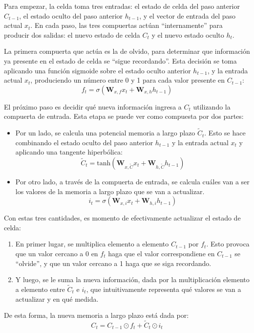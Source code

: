 \documentclass[../../main.tex]{subfiles}
\begin{document}
Para empezar, la celda toma tres entradas: el estado de celda del paso anterior
\(C_{t-1}\), el estado oculto del paso anterior \(h_{t-1}\), y el vector de entrada del
paso actual \(x_t\). En cada paso, las tres compuertas actúan ``internamente'' para
producir dos salidas: el nuevo estado de celda \(C_t\) y el nuevo estado oculto \(h_t\).

La primera compuerta que actúa es la de olvido, para determinar que información ya
presente en el estado de celda se ``sigue recordando''. Esta decisión se toma aplicando
una función sigmoide sobre el estado oculto anterior \(h_{t-1}\), y la entrada actual
\(x_t\), produciendo un número entre 0 y 1 para cada valor presente en \(C_{t-1}\):
\[
    f_t = \sigma \left( \bm{W}_{x,f} x_t + \bm{W}_{x,h} h_{t-1}  \right)
\]

El próximo paso es decidir qué nueva información ingresa a \(C_t\) utilizando la compuerta
de entrada. Esta etapa se puede ver como compuesta por dos partes:
\begin{itemize}
    \item Por un lado, se calcula una potencial memoria a largo plazo \(\tilde{C}_t\).
    Esto se hace combinando el estado oculto del paso anterior \(h_{t-1}\) y la entrada
    actual \(x_t\) y aplicando una tangente hiperbólica:
    \[
        \tilde{C}_t = \text{tanh} \left( \bm{W}_{x, \tilde{C}} x_t + \bm{W}_{h, \tilde{C}} h_{t-1}  \right)
    \]
    \item Por otro lado, a través de la compuerta de entrada, se calcula cuáles
    van a ser los valores de la memoria a largo plazo que se van a actualizar.
    \[
        i_t = \sigma \left( \bm{W}_{x, i} x_t + \bm{W}_{h, i} h_{t-1}  \right)
    \]
\end{itemize}

Con estas tres cantidades, es momento de efectivamente actualizar el estado de celda:
\begin{enumerate}
    \item En primer lugar, se multiplica elemento a elemento \(C_{t-1}\) por \(f_t\). Esto
    provoca que un valor cercano a 0 en \(f_t\) haga que el valor correspondiene en
    \(C_{t-1}\) se ``olvide'', y que un valor cercano a 1 haga que se siga recordando.
    \item Y luego, se le suma la nueva información, dada por la multiplicación
    elemento a elemento entre \(\tilde{C}_t\) e \(i_t\), que intuitivamente representa qué
    valores se van a actualizar y en qué medida.
\end{enumerate}
De esta forma, la nueva memoria a largo plazo está dada por:
\[
    C_t = C_{t-1} \odot f_t + \tilde{C}_t \odot i_t
\]
\end{document}
